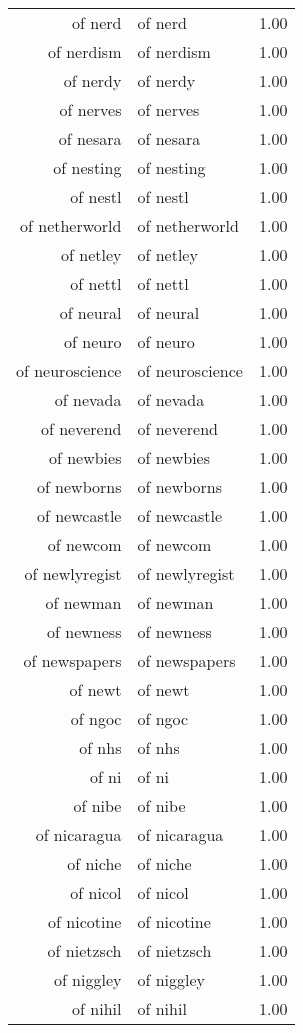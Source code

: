 \begin{table}[ht]
\begin{tabular}{rlr}
  of nerd & of nerd & 1.00 \\ 
  of nerdism & of nerdism & 1.00 \\ 
  of nerdy & of nerdy & 1.00 \\ 
  of nerves & of nerves & 1.00 \\ 
  of nesara & of nesara & 1.00 \\ 
  of nesting & of nesting & 1.00 \\ 
  of nestl & of nestl & 1.00 \\ 
  of netherworld & of netherworld & 1.00 \\ 
  of netley & of netley & 1.00 \\ 
  of nettl & of nettl & 1.00 \\ 
  of neural & of neural & 1.00 \\ 
  of neuro & of neuro & 1.00 \\ 
  of neuroscience & of neuroscience & 1.00 \\ 
  of nevada & of nevada & 1.00 \\ 
  of neverend & of neverend & 1.00 \\ 
  of newbies & of newbies & 1.00 \\ 
  of newborns & of newborns & 1.00 \\ 
  of newcastle & of newcastle & 1.00 \\ 
  of newcom & of newcom & 1.00 \\ 
  of newlyregist & of newlyregist & 1.00 \\ 
  of newman & of newman & 1.00 \\ 
  of newness & of newness & 1.00 \\ 
  of newspapers & of newspapers & 1.00 \\ 
  of newt & of newt & 1.00 \\ 
  of ngoc & of ngoc & 1.00 \\ 
  of nhs & of nhs & 1.00 \\ 
  of ni & of ni & 1.00 \\ 
  of nibe & of nibe & 1.00 \\ 
  of nicaragua & of nicaragua & 1.00 \\ 
  of niche & of niche & 1.00 \\ 
  of nicol & of nicol & 1.00 \\ 
  of nicotine & of nicotine & 1.00 \\ 
  of nietzsch & of nietzsch & 1.00 \\ 
  of niggley & of niggley & 1.00 \\ 
  of nihil & of nihil & 1.00 \\ 

\end{tabular}
\end{table}
